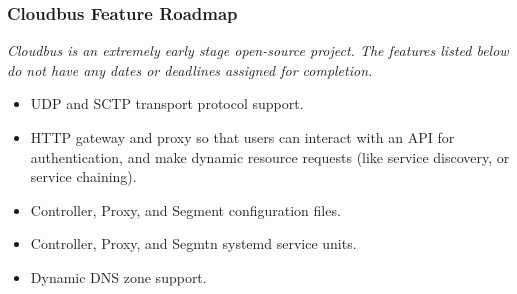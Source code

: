 \begin{frame}
	\frametitle{Cloudbus Feature Roadmap}
	\emph{Cloudbus is an extremely early stage open-source project. The features listed below do not have any dates or deadlines assigned for 
	completion.}\vspace{1em}
	\begin{itemize}
		\item UDP and SCTP transport protocol support.
		\item HTTP gateway and proxy so that users can interact with an API for authentication, and make dynamic resource requests (like service %
		discovery, or service chaining).
		\item Controller, Proxy, and Segment configuration files.
		\item Controller, Proxy, and Segmtn systemd service units.
		\item Dynamic DNS zone support.
		
	\end{itemize}
\end{frame}